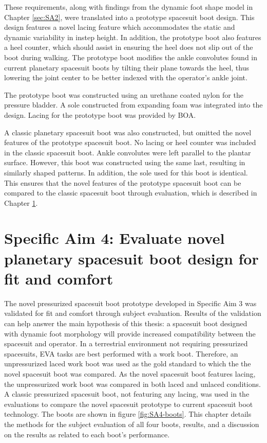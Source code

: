 \documentclass[defaultstyle,11pt]{thesis}
\begin{document}
These requirements, along with findings from the dynamic foot shape model in Chapter \ref{sec:SA2}, were translated into a prototype spacesuit boot design.
This design features a novel lacing feature which accommodates the static and dynamic variability in instep height.
In addition, the prototype boot also features a heel counter, which should assist in ensuring the heel does not slip out of the boot during walking.
The prototype boot modifies the ankle convolutes found in current planetary spacesuit boots by tilting their plane towards the heel, thus lowering the joint center to be better indexed with the operator's ankle joint.

The prototype boot was constructed using an urethane coated nylon for the pressure bladder.
A sole constructed from expanding foam was integrated into the design.
Lacing for the prototype boot was provided by BOA.

A classic planetary spacesuit boot was also constructed, but omitted the novel features of the prototype spacesuit boot.
No lacing or heel counter was included in the classic spacesuit boot.
Ankle convolutes were left parallel to the plantar surface.
However, this boot was constructed using the same last, resulting in similarly shaped patterns.
In addition, the sole used for this boot is identical.
This ensures that the novel features of the prototype spacesuit boot can be compared to the classic spacesuit boot through evaluation, which is described in Chapter \ref{sec:SA4}.

\hypertarget{sec:SA4}{%
\chapter{Specific Aim 4: Evaluate novel planetary spacesuit boot design for fit and comfort}\label{sec:SA4}}

The novel pressurized spacesuit boot prototype developed in Specific Aim 3 was validated for fit and comfort through subject evaluation.
Results of the validation can help answer the main hypothesis of this thesis: a spacesuit boot designed with dynamic foot morphology will provide increased compatibility between the spacesuit and operator.
In a terrestrial environment not requiring pressurized spacesuits, EVA tasks are best performed with a work boot.
Therefore, an unpressurized laced work boot was used as the gold standard to which the the novel spacesuit boot was compared.
As the novel spacesuit boot features lacing, the unpressurized work boot was compared in both laced and unlaced conditions.
A classic pressurized spacesuit boot, not featuring any lacing, was used in the evaluations to compare the novel spacesuit prototype to current spacesuit boot technology.
The boots are shown in figure \ref{fig:SA4-boots}.
This chapter details the methods for the subject evaluation of all four boots, results, and a discussion on the results as related to each boot's performance.
\end{document}
